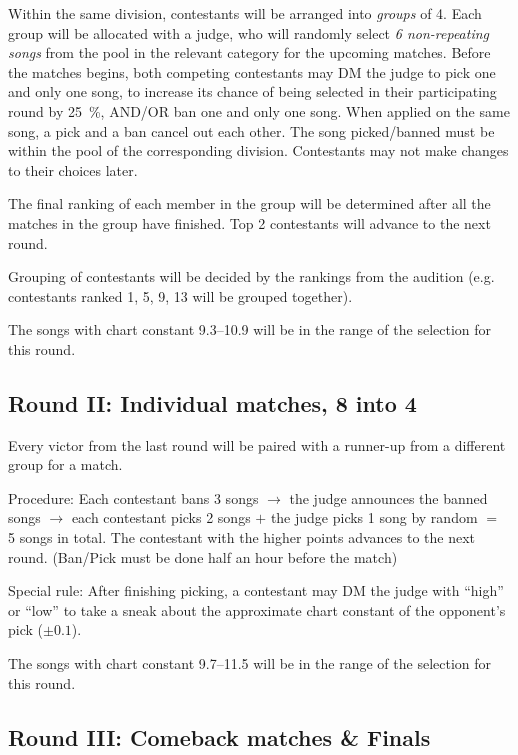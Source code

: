 \documentclass{article}
\newcommand{\alert}[1]{{\color{red} #1}}
\newcommand{\srbgcolor}{red!40}
\newcommand{\specialrule}[1]{\colorbox{\srbgcolor}{\parbox{\textwidth}{#1}}}
\begin{document}
Within the same division,
contestants will be arranged into \emph{groups} of 4.
Each group will be allocated with a judge,
who will randomly select \emph{6 non-repeating songs}
from the pool in the relevant category
for the upcoming matches.
Before the matches begins,
both competing contestants
may DM the judge to pick one and only one song,
to increase its chance of being selected
in their participating round by \qty{25}{\percent},
AND/OR ban one and only one song.
When applied on the same song,
a pick and a ban cancel out each other.
The song picked/banned must be within
the pool of the corresponding division.
Contestants may not make changes to their choices later.

The final ranking of each member in the group will be determined
after all the matches in the group have finished.
Top 2 contestants will advance to the next round.

Grouping of contestants will be decided
by the rankings from the audition
(e.g. contestants ranked 1, 5, 9, 13
will be grouped together).

\alert{
	The songs with chart constant 9.3--10.9
	will be in the range of the selection for this round.
}

\subsection{Round II: Individual matches, 8 into 4}

Every victor  %
from the last round
will be paired with a runner-up
from a different group for a match.

Procedure: Each contestant bans 3 songs $\rightarrow$
the judge announces the banned songs $\rightarrow$
each contestant picks 2 songs $+$ the judge picks 1 song by random $=$ 5 songs in total.
The contestant with the higher points advances to the next round.
(Ban/Pick must be done half an hour before the match)

\specialrule{
	Special rule: After finishing picking,
	a contestant may DM the judge with ``high'' or ``low''
	to take a sneak about
	the approximate chart constant of the opponent's pick
	($\pm0.1$).
}

\nopagebreak

\alert{
	The songs with chart constant 9.7--11.5
	will be in the range of the selection for this round.
}

\subsection{Round III: Comeback %
	matches \& Finals}
\end{document}
